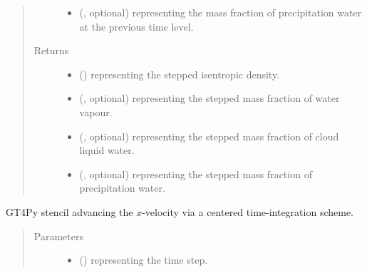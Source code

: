 \documentclass[letterpaper,10pt,english]{sphinxmanual}
\begin{document}
\begin{fulllineitems}
\begin{fulllineitems}
\begin{quote}
\begin{description}
\begin{itemize}
\item {} 
 (, optional) \textendash{}  representing the mass fraction of precipitation water at the previous time level.

\end{itemize}

\item[{Returns}] \leavevmode
\begin{itemize}
\item {} 
 () \textendash{}  representing the stepped isentropic density.

\item {} 
 (, optional) \textendash{}  representing the stepped mass fraction of water vapour.

\item {} 
 (, optional) \textendash{}  representing the stepped mass fraction of cloud liquid water.

\item {} 
 (, optional) \textendash{}  representing the stepped mass fraction of precipitation water.

\end{itemize}


\end{description}\end{quote}

\end{fulllineitems}


\begin{fulllineitems}
\label{\detokenize{api:dycore.prognostic_isentropic_nonconservative_centered.PrognosticIsentropicNonconservativeCentered._stencil_stepping_by_neglecting_vertical_advection_velocity_x_defs}}
GT4Py stencil advancing the \(x\)-velocity via a centered time-integration scheme.
\begin{quote}\begin{description}
\item[{Parameters}] \leavevmode\begin{itemize}
\item {} 
 () \textendash{}  representing the time step.


\end{itemize}
\end{description}
\end{quote}
\end{fulllineitems}
\end{fulllineitems}
\end{document}
